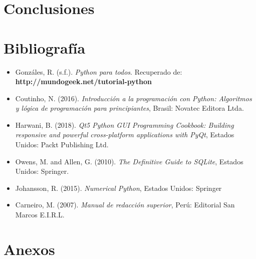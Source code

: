 \documentclass[12pt,a4paper]{report}
\begin{document}
\section{Conclusiones}

\section{Bibliografía}
\begin{itemize}
	\item Gonzáles, R. (s.f.). \textit{Python para todos}. Recuperado de: \textbf{http://mundogeek.net/tutorial-python}
	\item Coutinho, N. (2016). \textit{Introducción a la programación con Python: Algoritmos y lógica de programación para principiantes}, Brasil: Novatec Editora Ltda.
	\item Harwani, B. (2018). \textit{Qt5 Python GUI Programming Cookbook: Building responsive and powerful cross-platform applications with PyQt}, Estados Unidos: Packt Publishing Ltd.
	\item Owens, M. and Allen, G. (2010). \textit{The Definitive Guide to SQLite}, Estados Unidos: Springer.
	\item Johansson, R. (2015). \textit{Numerical Python}, Estados Unidos: Springer
	\item Carneiro, M. (2007). \textit{Manual de redacción superior}, Perú: Editorial San Marcos E.I.R.L.
\end{itemize}

\section{Anexos}
\end{document}
